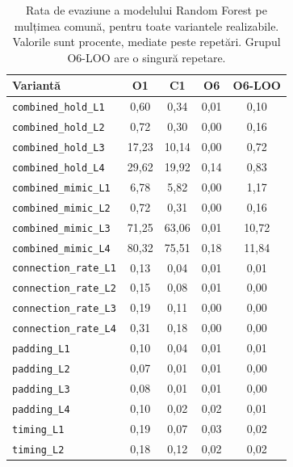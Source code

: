 \begin{table}[!ht]
    \caption{Rata de evaziune a modelului Random Forest pe mulțimea comună, pentru toate variantele realizabile. Valorile sunt procente, mediate peste repetări. Grupul O6-LOO are o singură repetare.}
    \centering\footnotesize
    \begin{tabular}{|l|c|c|c|c|}
        \hline
        \textbf{Variantă} & \textbf{O1} & \textbf{C1} & \textbf{O6} & \textbf{O6-LOO} \\
        \hline
        \texttt{combined\_hold\_L1} & 0,60 & 0,34 & 0,01 & 0,10 \\
        \hline
        \texttt{combined\_hold\_L2} & 0,72 & 0,30 & 0,00 & 0,16 \\
        \hline
        \texttt{combined\_hold\_L3} & 17,23 & 10,14 & 0,00 & 0,72 \\
        \hline
        \texttt{combined\_hold\_L4} & 29,62 & 19,92 & 0,14 & 0,83 \\
        \hline
        \texttt{combined\_mimic\_L1} & 6,78 & 5,82 & 0,00 & 1,17 \\
        \hline
        \texttt{combined\_mimic\_L2} & 0,72 & 0,31 & 0,00 & 0,16 \\
        \hline
        \texttt{combined\_mimic\_L3} & 71,25 & 63,06 & 0,01 & 10,72 \\
        \hline
        \texttt{combined\_mimic\_L4} & 80,32 & 75,51 & 0,18 & 11,84 \\
        \hline
        \texttt{connection\_rate\_L1} & 0,13 & 0,04 & 0,01 & 0,01 \\
        \hline
        \texttt{connection\_rate\_L2} & 0,15 & 0,08 & 0,01 & 0,00 \\
        \hline
        \texttt{connection\_rate\_L3} & 0,19 & 0,11 & 0,00 & 0,00 \\
        \hline
        \texttt{connection\_rate\_L4} & 0,31 & 0,18 & 0,00 & 0,00 \\
        \hline
        \texttt{padding\_L1} & 0,10 & 0,04 & 0,01 & 0,01 \\
        \hline
        \texttt{padding\_L2} & 0,07 & 0,01 & 0,01 & 0,00 \\
        \hline
        \texttt{padding\_L3} & 0,08 & 0,01 & 0,01 & 0,00 \\
        \hline
        \texttt{padding\_L4} & 0,10 & 0,02 & 0,02 & 0,01 \\
        \hline
        \texttt{timing\_L1} & 0,19 & 0,07 & 0,03 & 0,02 \\
        \hline
        \texttt{timing\_L2} & 0,18 & 0,12 & 0,02 & 0,02 \\

\end{tabular}
\end{table}
